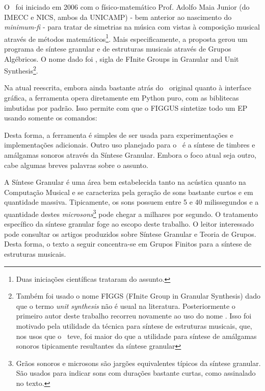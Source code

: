 O \figgus\ foi iniciado em 2006 com o físico-matemático Prof. Adolfo Maia Junior (do IMECC e NICS, ambos da UNICAMP) - bem anterior
ao nascimento do \emph{minimum-fi} - para
tratar de simetrias na música com vistas à composição musical através
de métodos matemáticos\footnote{Duas iniciações científicas trataram do assunto.}. Mais especificamente, a proposta gerou
um programa de síntese
granular e de estruturas musicais através de Grupos Algébricos. O nome dado
foi \figgus, sigla de FInite Groups in Granular and Unit Synthesis\footnote{Também foi usado
o nome FIGGS (FInite Group in Granular Synthesis) dado que o termo \emph{unit synthesis} não
é usual na literatura. Posteriormente o primeiro autor deste trabalho recorreu novamente
ao uso do nome \figgus. Isso foi motivado pela utilidade
da técnica para síntese de estruturas musicais, que, nos usos que o \figgus\ teve, foi maior do que a utilidade para síntese de amálgamas sonoros tipicamente resultantes da síntese granular}.

Na atual reescrita, embora ainda bastante atrás do \figgus\ original quanto
à interface gráfica, a ferramenta opera diretamente em Python puro,
com as biblitecas imbutidas por padrão. Isso permite com que o FIGGUS
sintetize todo um EP usando somente os comandos:


Desta forma, a ferramenta 
é simples de ser usada para experimentações
e implementações adicionais.
Outro uso planejado para o \figgus\
é a síntese de timbres e amálgamas sonoros através da
Síntese Granular. Embora o foco atual seja outro, cabe algumas breves
palavras sobre o assunto.

A Síntese Granular é uma área bem estabelecida tanto na acústica quanto
na Computação Musical e se caracteriza pela geração de sons bastante curtos
e em quantidade massiva. Tipicamente, os sons possuem entre 5 e 40 milissegundos
e a quantidade destes \emph{microsons}\footnote{Grãos sonoros e microsons são jargões equivalentes
típicos da síntese granular. São usados para indicar sons com durações
bastante curtas, como assinalado no texto.} pode chegar a milhares por segundo. O tratamento específico da
síntese granular foge ao escopo deste trabalho. O leitor interessado pode consultar os artigos produzidos sobre Síntese Granular e Teoria de Grupos.\cite{figgusOriginal,figgusEspacializacao}
Desta forma, o texto a seguir concentra-se em Grupos Finitos para a síntese de estruturas musicais.

